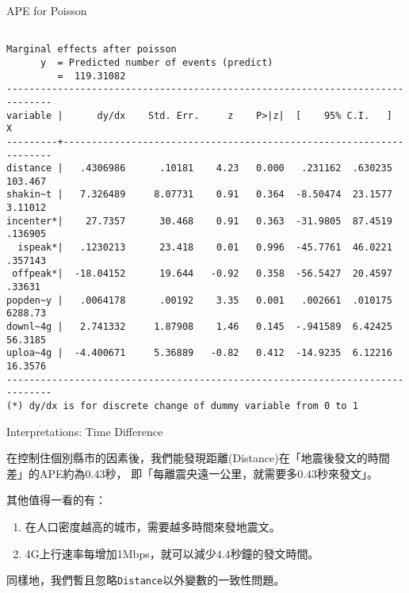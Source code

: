 \begin{frame}[fragile]{APE for Poisson}


\lstset{basicstyle=\tiny,style=myCustomMatlabStyle}

\begin{lstlisting}

Marginal effects after poisson
      y  = Predicted number of events (predict)
         =  119.31082
------------------------------------------------------------------------------
variable |      dy/dx    Std. Err.     z    P>|z|  [    95% C.I.   ]      X
---------+--------------------------------------------------------------------
distance |   .4306986      .10181    4.23   0.000   .231162  .630235   103.467
shakin~t |   7.326489     8.07731    0.91   0.364  -8.50474  23.1577   3.11012
incenter*|    27.7357      30.468    0.91   0.363  -31.9805  87.4519   .136905
  ispeak*|   .1230213      23.418    0.01   0.996  -45.7761  46.0221   .357143
 offpeak*|  -18.04152      19.644   -0.92   0.358  -56.5427  20.4597    .33631
popden~y |   .0064178      .00192    3.35   0.001   .002661  .010175   6288.73
downl~4g |   2.741332     1.87908    1.46   0.145  -.941589  6.42425   56.3185
uploa~4g |  -4.400671     5.36889   -0.82   0.412  -14.9235  6.12216   16.3576
------------------------------------------------------------------------------
(*) dy/dx is for discrete change of dummy variable from 0 to 1

\end{lstlisting}

\end{frame}



\begin{frame}[fragile]{Interpretations: Time Difference}

在控制住個別縣市的因素後，我們能發現距離(Distance)在「地震後發文的時間差」的APE約為$0.43$秒，
即「每離震央遠一公里，就需要多$0.43$秒來發文」。

其他值得一看的有：

\begin{enumerate}
    \item 在人口密度越高的城市，需要越多時間來發地震文。
    \item 4G上行速率每增加1Mbps，就可以減少$4.4$秒鐘的發文時間。
\end{enumerate}

同樣地，我們暫且忽略\texttt{Distance}以外變數的一致性問題。

\end{frame}


